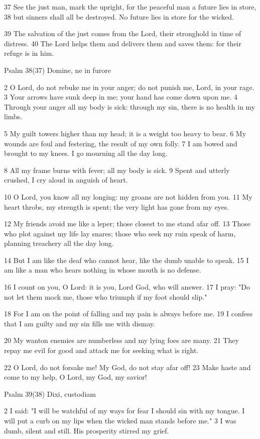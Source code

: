 37 See the just man, mark the upright,
for the peaceful man a future lies in store,
38 but sinners shall all be destroyed.
No future lies in store for the wicked.

39 The salvation of the just comes from the Lord,
their stronghold in time of distress.
40 The Lord helps them and delivers them
and saves them: for their refuge is in him.


Psalm 38(37) Domine, ne in furore

2 O Lord, do not rebuke me in your anger;
do not punish me, Lord, in your rage.
3 Your arrows have sunk deep in me;
your hand has come down upon me.
4 Through your anger all my body is sick:
through my sin, there is no health in my limbs.

5 My guilt towers higher than my head;
it is a weight too heavy to bear.
6 My wounds are foul and festering,
the result of my own folly.
7 I am bowed and brought to my knees.
I go mourning all the day long.

8 All my frame burns with fever;
all my body is sick.
9 Spent and utterly crushed,
I cry aloud in anguish of heart.

10 O Lord, you know all my longing:
my groans are not hidden from you.
11 My heart throbs, my strength is spent;
the very light has gone from my eyes.

12 My friends avoid me like a leper;
those closest to me stand afar off.
13 Those who plot against my life lay snares;
those who seek my ruin speak of harm,
planning treachery all the day long.

14 But I am like the deaf who cannot hear,
like the dumb unable to speak.
15 I am like a man who hears nothing
in whose mouth is no defense.

16 I count on you, O Lord:
it is you, Lord God, who will answer.
17 I pray: "Do not let them mock me,
those who triumph if my foot should slip."

18 For I am on the point of falling
and my pain is always before me.
19 I confess that I am guilty
and my sin fills me with dismay.

20 My wanton enemies are numberless
and my lying foes are many.
21 They repay me evil for good
and attack me for seeking what is right.

22 O Lord, do not forsake me!
My God, do not stay afar off!
23 Make haste and come to my help,
O Lord, my God, my savior!


Psalm 39(38) Dixi, custodiam

2 I said: "I will be watchful of my ways
for fear I should sin with my tongue.
I will put a curb on my lips
when the wicked man stands before me."
3 I was dumb, silent and still.
His prosperity stirred my grief.

